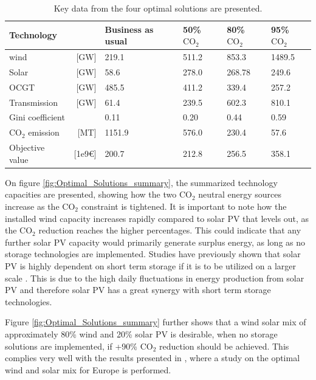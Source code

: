 \begin{table}[h]
	\begin{tabular}{lr|llll}
		Technology      & & Business as usual & 50\% $\text{CO}_2$  & 80\% $\text{CO}_2$  & 95\% $\text{CO}_2$  \\ \hline
	wind &[GW] & 219.1 & 511.2 & 853.3 & 1489.5 \\
	Solar &[GW]& 58.6 & 278.0 & 268.78 & 249.6 \\
	OCGT &[GW]& 485.5 & 411.2 & 339.4 & 257.2 \\
	Transmission &[GW]& 61.4 & 239.5 & 602.3 & 810.1 \\
	Gini coefficient & & 0.11 & 0.20 & 0.44 & 0.59 \\
	$\text{CO}_2$ emission &[MT] & 1151.9 & 576.0 & 230.4 & 57.6 \\
	Objective value &[1e9\euro] & 200.7 & 212.8 & 256.5 & 358.1 \\         
	\end{tabular}
	\caption{Key data from the four optimal solutions are presented.}
	\label{tab:Optimal_Solutions_summary}
\end{table}

On figure \ref{fig:Optimal_Solutions_summary}, the summarized technology capacities are presented, showing how the two $\text{CO}_2$ neutral energy sources increase as the $\text{CO}_2$ constraint is tightened. It is important to note how the installed wind capacity increases rapidly compared to solar PV that levels out, as the $\text{CO}_2$ reduction reaches the higher percentages. This could indicate that any further solar PV capacity would primarily generate surplus energy, as long as no storage technologies are implemented. Studies have previously shown that solar PV is highly dependent on short term storage if it is to be utilized on a larger scale \cite{rasmussen2011a} \cite{VICTORIA2019111977}. This is due to the high daily fluctuations in energy production from solar PV and therefore solar PV has a great synergy with short term storage technologies. 

Figure \ref{fig:Optimal_Solutions_summary} further shows that a wind solar mix of approximately 80\% wind and 20\% solar PV is desirable, when no storage solutions are implemented, if +90\% $\text{CO}_2$ reduction should be achieved. This complies very well with the results presented in \cite{rasmussen2011a}, where a study on the optimal wind and solar mix for Europe is performed. 


